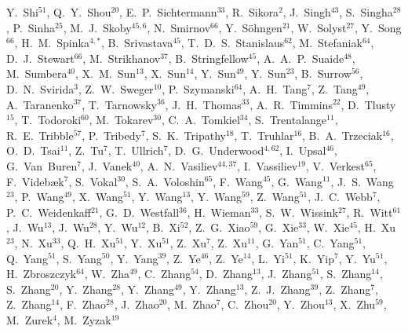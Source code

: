 {Y.~Shi$^{51}$,
Q.~Y.~Shou$^{20}$,
E.~P.~Sichtermann$^{33}$,
R.~Sikora$^{2}$,
J.~Singh$^{43}$,
S.~Singha$^{28}$,
P.~Sinha$^{25}$,
M.~J.~Skoby$^{45,6}$,
N.~Smirnov$^{66}$,
Y.~S\"{o}hngen$^{21}$,
W.~Solyst$^{27}$,
Y.~Song$^{66}$,
H.~M.~Spinka$^{4,*}$,
B.~Srivastava$^{45}$,
T.~D.~S.~Stanislaus$^{62}$,
M.~Stefaniak$^{64}$,
D.~J.~Stewart$^{66}$,
M.~Strikhanov$^{37}$,
B.~Stringfellow$^{45}$,
A.~A.~P.~Suaide$^{48}$,
M.~Sumbera$^{40}$,
X.~M.~Sun$^{13}$,
X.~Sun$^{14}$,
Y.~Sun$^{49}$,
Y.~Sun$^{23}$,
B.~Surrow$^{56}$,
D.~N.~Svirida$^{3}$,
Z.~W.~Sweger$^{10}$,
P.~Szymanski$^{64}$,
A.~H.~Tang$^{7}$,
Z.~Tang$^{49}$,
A.~Taranenko$^{37}$,
T.~Tarnowsky$^{36}$,
J.~H.~Thomas$^{33}$,
A.~R.~Timmins$^{22}$,
D.~Tlusty$^{15}$,
T.~Todoroki$^{60}$,
M.~Tokarev$^{30}$,
C.~A.~Tomkiel$^{34}$,
S.~Trentalange$^{11}$,
R.~E.~Tribble$^{57}$,
P.~Tribedy$^{7}$,
S.~K.~Tripathy$^{18}$,
T.~Truhlar$^{16}$,
B.~A.~Trzeciak$^{16}$,
O.~D.~Tsai$^{11}$,
Z.~Tu$^{7}$,
T.~Ullrich$^{7}$,
D.~G.~Underwood$^{4,62}$,
I.~Upsal$^{46}$,
G.~Van~Buren$^{7}$,
J.~Vanek$^{40}$,
A.~N.~Vasiliev$^{44,37}$,
I.~Vassiliev$^{19}$,
V.~Verkest$^{65}$,
F.~Videb{\ae}k$^{7}$,
S.~Vokal$^{30}$,
S.~A.~Voloshin$^{65}$,
F.~Wang$^{45}$,
G.~Wang$^{11}$,
J.~S.~Wang$^{23}$,
P.~Wang$^{49}$,
X.~Wang$^{51}$,
Y.~Wang$^{13}$,
Y.~Wang$^{59}$,
Z.~Wang$^{51}$,
J.~C.~Webb$^{7}$,
P.~C.~Weidenkaff$^{21}$,
G.~D.~Westfall$^{36}$,
H.~Wieman$^{33}$,
S.~W.~Wissink$^{27}$,
R.~Witt$^{61}$,
J.~Wu$^{13}$,
J.~Wu$^{28}$,
Y.~Wu$^{12}$,
B.~Xi$^{52}$,
Z.~G.~Xiao$^{59}$,
G.~Xie$^{33}$,
W.~Xie$^{45}$,
H.~Xu$^{23}$,
N.~Xu$^{33}$,
Q.~H.~Xu$^{51}$,
Y.~Xu$^{51}$,
Z.~Xu$^{7}$,
Z.~Xu$^{11}$,
G.~Yan$^{51}$,
C.~Yang$^{51}$,
Q.~Yang$^{51}$,
S.~Yang$^{50}$,
Y.~Yang$^{39}$,
Z.~Ye$^{46}$,
Z.~Ye$^{14}$,
L.~Yi$^{51}$,
K.~Yip$^{7}$,
Y.~Yu$^{51}$,
H.~Zbroszczyk$^{64}$,
W.~Zha$^{49}$,
C.~Zhang$^{54}$,
D.~Zhang$^{13}$,
J.~Zhang$^{51}$,
S.~Zhang$^{14}$,
S.~Zhang$^{20}$,
Y.~Zhang$^{28}$,
Y.~Zhang$^{49}$,
Y.~Zhang$^{13}$,
Z.~J.~Zhang$^{39}$,
Z.~Zhang$^{7}$,
Z.~Zhang$^{14}$,
F.~Zhao$^{28}$,
J.~Zhao$^{20}$,
M.~Zhao$^{7}$,
C.~Zhou$^{20}$,
Y.~Zhou$^{13}$,
X.~Zhu$^{59}$,
M.~Zurek$^{4}$,
M.~Zyzak$^{19}$
}

\address{\rm{(STAR Collaboration)}}


